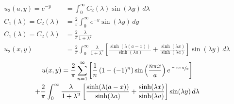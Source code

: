 \documentclass[../../HW08.tex]{subfiles}
\begin{document}
\begin{align*}
    u_{2}(a,y) = e^{-y}             & = \int_{0}^{\infty} C_{2}(\lambda)\sin(\lambda y)\,d\lambda                                                                                                                                            \\
    C_{1}(\lambda) = C_{2}(\lambda) & = \frac{2}{\pi}\int_{0}^{\infty} e^{-y}\sin(\lambda y)\,dy                                                                                                                                             \\
    C_{1}(\lambda) = C_{2}(\lambda) & = \frac{2}{\pi} \frac{\lambda}{1 + \lambda^{2}}                                                                                                                                                        \\
    u_{2}(x,y)                      & = \frac{2}{\pi} \int_{0}^{\infty}  \frac{\lambda}{1 + \lambda^{2}} \left[ \frac{\sinh(\lambda(a-x))}{\sinh(\lambda a)} + \frac{\sinh(\lambda x)}{\sinh(\lambda a)} \right]\sin( \lambda y )\, d\lambda
\end{align*}
\begin{multline*}
    u(x,y) = \frac{2}{\pi}\sum_{n=1}^{\infty} \left[ \frac{1}{n} \left( 1-(-1)^{n} \right)\sin\left( \frac{n\pi x}{a} \right)  e^{\sfrac{-n\pi y}{a}} \right] \\
    + \frac{2}{\pi} \int_{0}^{\infty}  \frac{\lambda}{1 + \lambda^{2}} \left[ \frac{\sinh(\lambda(a-x))}{\sinh(\lambda a)} + \frac{\sinh(\lambda x)}{\sinh(\lambda a)} \right]\sin( \lambda y )\, d\lambda
\end{multline*}
\end{document}
